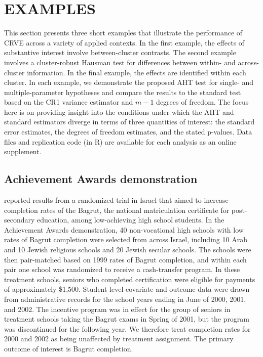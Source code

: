 \documentclass[draft]{ectaart}\usepackage[]{graphicx}\usepackage[]{color}
\begin{document}
\section{EXAMPLES}
\label{sec:examples}

This section presents three short examples that illustrate the performance of CRVE across a variety of applied contexts. 
In the first example, the effects of substantive interest involve between-cluster contrasts. 
The second example involves a cluster-robust Hausman test for differences between within- and across-cluster information. 
In the final example, the effects are identified within each cluster. 
In each example, we demonstrate the proposed AHT test for single- and multiple-parameter hypotheses and compare the results to the standard test based on the CR1 variance estimator and $m - 1$ degrees of freedom. 
The focus here is on providing insight into the conditions under which the AHT and standard estimators diverge in terms of three quantities of interest: the standard error estimates, the degrees of freedom estimates, and the stated p-values. 
Data files and replication code (in R) are available for each analysis as an online supplement.

\subsection{Achievement Awards demonstration} 

\citet{Angrist2009effects} reported results from a randomized trial in Israel that aimed to increase completion rates of the Bagrut, the national matriculation certificate for post-secondary education, among low-achieving high school students. 
In the Achievement Awards demonstration, 40 non-vocational high schools with low rates of Bagrut completion were selected from across Israel, including 10 Arab and 10 Jewish religious schools and 20 Jewish secular schools. 
The schools were then pair-matched based on 1999 rates of Bagrut completion, and within each pair one school was randomized to receive a cash-transfer program. 
In these treatment schools, seniors who completed certification were eligible for payments of approximately \$1,500. 
Student-level covariate and outcome data were drawn from administrative records for the school years ending in June of 2000, 2001, and 2002. 
The incentive program was in effect for the group of seniors in treatment schools taking the Bagrut exams in Spring of 2001, but the program was discontinued for the following year. 
We therefore treat completion rates for 2000 and 2002 as being unaffected by treatment assignment.
The primary outcome of interest is Bagrut completion. 
\end{document}
